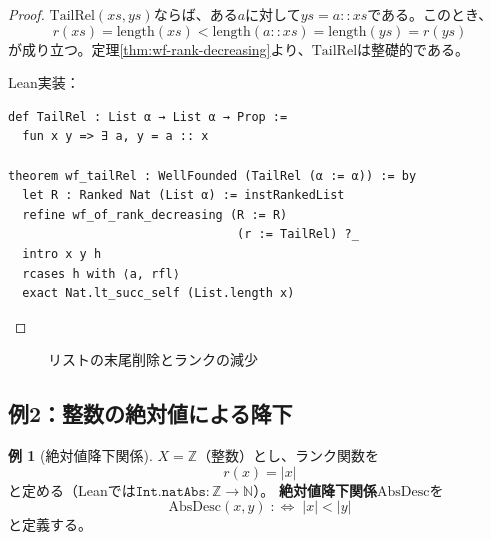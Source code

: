 \documentclass[11pt,a4paper]{ltjsarticle}
\theoremstyle{definition}
\newtheorem{example}[definition]{例}
\begin{document}
\begin{proof}
$\mathrm{TailRel}(xs, ys)$ならば、ある$a$に対して$ys = a :: xs$である。このとき、
\[
r(xs) = \mathrm{length}(xs) < \mathrm{length}(a :: xs) = \mathrm{length}(ys) = r(ys)
\]
が成り立つ。定理\ref{thm:wf-rank-decreasing}より、$\mathrm{TailRel}$は整礎的である。

Lean実装：
\begin{lstlisting}[style=leanstyle]
def TailRel : List α → List α → Prop :=
  fun x y => ∃ a, y = a :: x

theorem wf_tailRel : WellFounded (TailRel (α := α)) := by
  let R : Ranked Nat (List α) := instRankedList
  refine wf_of_rank_decreasing (R := R)
                                (r := TailRel) ?_
  intro x y h
  rcases h with ⟨a, rfl⟩
  exact Nat.lt_succ_self (List.length x)
\end{lstlisting}
\end{proof}

\begin{figure}[htbp]
\centering
{}
\caption{リストの末尾削除とランクの減少}
\end{figure}

\subsection{例2：整数の絶対値による降下}

\begin{example}[絶対値降下関係]
$X = \mathbb{Z}$（整数）とし、ランク関数を
\[
r(x) = |x|
\]
と定める（Leanでは$\texttt{Int.natAbs} : \mathbb{Z} \to \mathbb{N}$）。
\textbf{絶対値降下関係}$\mathrm{AbsDesc}$を
\[
\mathrm{AbsDesc}(x, y) \;:\!\!\iff\; |x| < |y|
\]
と定義する。
\end{example}
\end{document}
